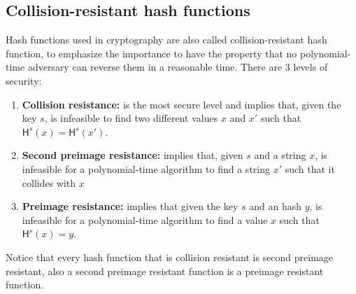 \subsection{Collision-resistant hash functions}
Hash functions used in cryptography are also called collision-resistant hash function, to emphasize the importance to have the property that no polynomial-time adversary can reverse them in a reasonable time.
There are 3 levels of security:
\begin{enumerate}
    \item{\textbf{Collision resistance:} is the most secure level and implies that, given the key $s$, is infeasible to find two different values $x$ and $x'$ such that $\mathsf{H}^s(x) = \mathsf{H}^s(x')$.}
    \item{\textbf{Second preimage resistance:} implies that, given $s$ and a string $x$, is infeasible for a polynomial-time algorithm to find a string $x'$ such that it collides with $x$}
    \item{\textbf{Preimage resistance:} implies that given the key $s$ and an hash $y$, is infeasible for a polynomial-time algorithm to find a value $x$ such that $\mathsf{H}^s(x) = y$.}
\end{enumerate}
Notice that every hash function that is collision resistant is second preimage resistant, also a second preimage resistant function is a preimage resistant function.\\

